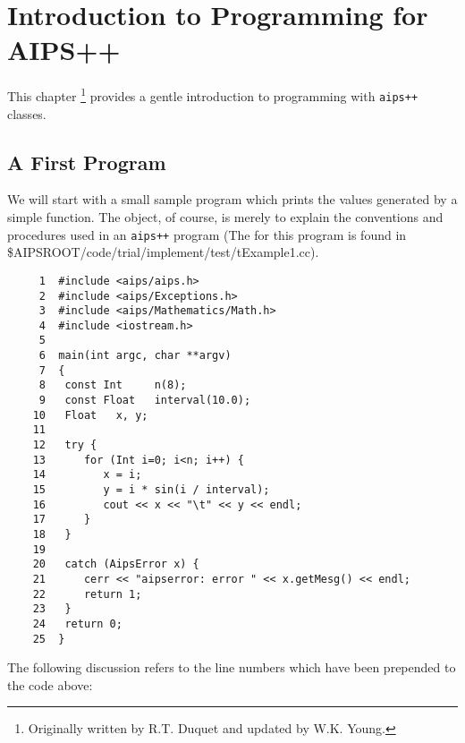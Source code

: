 \chapter{Introduction to Programming for AIPS++ \label{Coding.IntroToProgramming}}

This chapter \footnote{Originally written by R.T. Duquet and updated by W.K. Young.} provides a
gentle introduction to programming with {\tt aips++} classes.\\
\begin{htmlonly}
\end{htmlonly}

\section{A First Program \label{Coding.FirstProgram}}
        We will start with a small sample program which prints
the values generated by a simple function.  The object, of course, is
merely to explain the conventions and procedures used in an {\tt aips++}
program 
(The 
for this program is found in 
\$AIPSROOT/code/trial/implement/test/tExample1.cc). 


\begin{verbatim}
     1  #include <aips/aips.h>
     2  #include <aips/Exceptions.h>
     3  #include <aips/Mathematics/Math.h>
     4  #include <iostream.h>
     5
     6  main(int argc, char **argv)
     7  {
     8   const Int     n(8);
     9   const Float   interval(10.0);
    10   Float   x, y;
    11
    12   try {
    13      for (Int i=0; i<n; i++) {
    14         x = i;
    15         y = i * sin(i / interval);
    16         cout << x << "\t" << y << endl;
    17      }
    18   }
    19
    20   catch (AipsError x) {
    21      cerr << "aipserror: error " << x.getMesg() << endl;
    22      return 1;
    23   }
    24   return 0;
    25  }

\end{verbatim}

The following discussion refers to the line numbers which have been
prepended to the code above:

